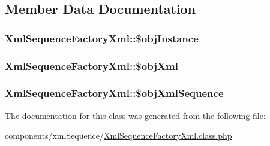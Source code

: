\subsection{Member Data Documentation}
\hypertarget{class_xml_sequence_factory_xml_9ca8b6656cdaf015c7016825782b81b1}{
\subsubsection[{\$objInstance}]{\setlength{\rightskip}{0pt plus 5cm}XmlSequenceFactoryXml::\$objInstance}}
\label{class_xml_sequence_factory_xml_9ca8b6656cdaf015c7016825782b81b1}


\hypertarget{class_xml_sequence_factory_xml_f3fc8098a87d7549b61c2a8a39fdf38e}{
\subsubsection[{\$objXml}]{\setlength{\rightskip}{0pt plus 5cm}XmlSequenceFactoryXml::\$objXml}}
\label{class_xml_sequence_factory_xml_f3fc8098a87d7549b61c2a8a39fdf38e}


\hypertarget{class_xml_sequence_factory_xml_1d865d45fe3869ce6fa4e04fb6abb67f}{
\subsubsection[{\$objXmlSequence}]{\setlength{\rightskip}{0pt plus 5cm}XmlSequenceFactoryXml::\$objXmlSequence}}
\label{class_xml_sequence_factory_xml_1d865d45fe3869ce6fa4e04fb6abb67f}




The documentation for this class was generated from the following file:\begin{CompactItemize}
\item 
components/xmlSequence/\hyperlink{_xml_sequence_factory_xml_8class_8php}{XmlSequenceFactoryXml.class.php}\end{CompactItemize}
